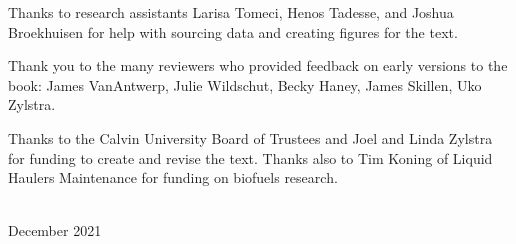 Thanks to research assistants Larisa Tomeci, Henos Tadesse, and Joshua Broekhuisen
for help with sourcing data and creating figures for the text. 

Thank you to the many reviewers who provided feedback on early versions to the book:
James VanAntwerp, Julie Wildschut, Becky Haney, James Skillen, Uko Zylstra.


Thanks to the Calvin University Board of Trustees and Joel and Linda Zylstra
for funding to create and revise the text.
Thanks also to Tim Koning of Liquid Haulers Maintenance for funding on biofuels research.



\vspace*{2pc}
\noindent\AUTHORS\\
\noindent December 2021
 
\clearpage

\blankpage

